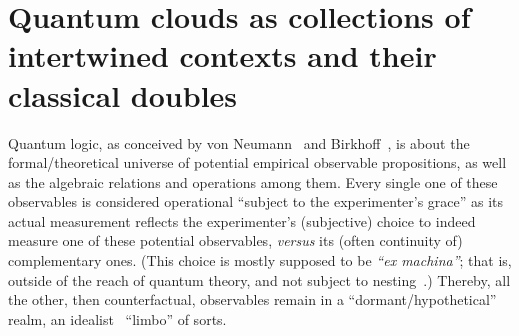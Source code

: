 \documentclass[%
  reprint,
  twocolumn,
 showpacs,
 showkeys,
 preprintnumbers,
 amsmath,amssymb,
 aps,
  prl,
  longbibliography,
 ]{revtex4-1}
\begin{document}



\section{Quantum clouds as collections of intertwined contexts and their classical doubles}

Quantum logic, as conceived by von Neumann~\cite{v-neumann-49,v-neumann-55} and Birkhoff~\cite{birkhoff-36},
is about the formal/theoretical universe of potential empirical observable propositions,
as well as the algebraic relations and operations among them.
Every single one of these observables is considered operational ``subject to the experimenter's grace''
as its actual measurement reflects the experimenter's (subjective) choice to indeed measure one of these
potential observables, {\it versus} its (often continuity of) complementary ones.
(This choice is mostly supposed to be {\it ``ex machina''}; that is, outside of the reach of quantum theory,
and not subject to nesting~\cite{everett,wigner:mb,everett-1956}.)
Thereby, all the other, then counterfactual, observables remain in a ``dormant/hypothetical'' realm,
an idealist~\cite{berkeley,stace} ``limbo'' of sorts.
\end{document}

